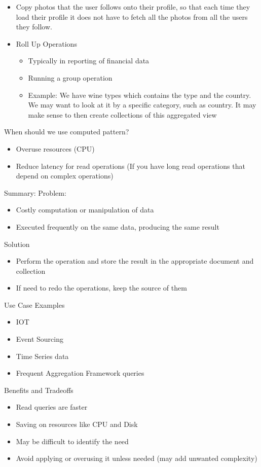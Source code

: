 \documentclass[11pt]{article}
\begin{document}
\begin{enumerate}
\begin{itemize}
\begin{itemize}
\begin{itemize}
\item Copy photos that the user follows onto their profile, so that each time they load their profile it does not have to fetch all the photos from all the users they follow.
\end{itemize}
\end{itemize}
\end{itemize}
\begin{itemize}
\item Roll Up Operations
\begin{itemize}
\item Typically in reporting of financial data
\item Running a group operation
\item Example: We have wine types which contains the type and the country. We may want to look at it by a specific category, such as country. It may make sense to then create collections of this aggregated view
\end{itemize}
\end{itemize}

When should we use computed pattern?
\begin{itemize}
\item Overuse resources (CPU)
\item Reduce latency for read operations (If you have long read operations that depend on complex operations)
\end{itemize}

Summary:
Problem:
\begin{itemize}
\item Costly computation or manipulation of data
\item Executed frequently on the same data, producing the same result
\end{itemize}

Solution
\begin{itemize}
\item Perform the operation and store the result in the appropriate document and collection
\item If need to redo the operations, keep the source of them
\end{itemize}

Use Case Examples
\begin{itemize}
\item IOT
\item Event Sourcing
\item Time Series data
\item Frequent Aggregation Framework queries
\end{itemize}

Benefits and Tradeoffs
\begin{itemize}
\item Read queries are faster
\item Saving on resources like CPU and Disk
\item May be difficult to identify the need
\item Avoid applying or overusing it unless needed (may add unwanted complexity)
\end{itemize}
\end{enumerate}
\end{document}
